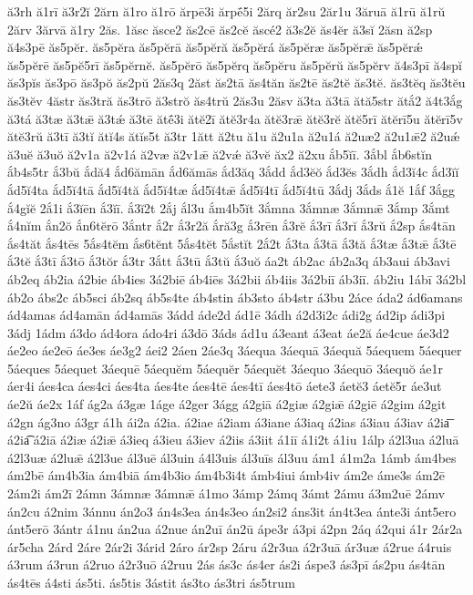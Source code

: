 {ă3rh
ă1rī
ă3r2ĭ
2ărn
ă1ro
ă1rō
ărpē3i
ărpḗ5i
2ărq
ăr2su
2ăr1u
3ăruā
ă1rū
ă1rŭ
2ărv
3ărvā
ă1ry
2ăs.
1ăsc
ăsce2
ăs2cē
ăs2cĕ
ăscé2
ă3s2ĕ
ăs4ĕr
ă3sĭ
2ăsn
ă2sp
ă4s3pē
ăs5pĕr.
ăs5pĕra
ăs5pĕrā
ăs5pĕră
ăs5pĕrá
ăs5pĕræ
ăs5pĕrǣ
ăs5pĕrǽ
ăs5pĕrē
ăs5pĕ5rī
ăs5pĕrnĕ.
ăs5pĕrō
ăs5pĕrq
ăs5pĕru
ăs5pĕrŭ
ăs5pĕrv
ă4s3pī
ă4spĭ
ăs3pĭs
ăs3pō
ăs3pŏ
ăs2pŭ
2ăs3q
2ăst
ăs2tā
ăs4tăn
ăs2tē
ăs2tĕ
ăs3tĕ.
ăs3tĕq
ăs3tĕu
ăs3tĕv
4ăstr
ăs3tră
ăs3trō
ă3strŏ
ăs4trŭ
2ăs3u
2ăsv
ă3ta
ă3tā
ătă5str
ătắ2
ă4t3ắg
ă3tá
ă3tæ
ă3tǣ
ă3tǽ
ă3tē
ătḗ3i
ătĕ2ī
ătĕ3r4a
ătĕ3rǣ
ătĕ3rĕ
ătĕ5rī
ătĕrī5u
ătĕrī5v
ătĕ3rŭ
ă3tī
ă3tĭ
ătĭ4s
ătĭs5t
ă3tr
1ătt
ă2tu
ă1u
ă2u1a
ă2u1á
ă2uæ2
ă2u1ǣ2
ă2uǽ
ă3uĕ
ă3uŏ
ă2v1a
ă2v1á
ă2væ
ă2v1ǣ
ă2vǽ
ă3vĕ
ăx2
ă2xu
ắb5ĭī.
3ắbl
ắb6stĭn
ắb4s5tr
ắ3bŭ
ắdă4
ắd6ămān
ắd6ămās
ắd3ăq
3ắdd
ắd3ĕŏ
ắd3ĕs
3ắdh
ắd3ĭ4c
ắd3ĭĭ
ắd5ĭ4ta
ắd5ĭ4tā
ắd5ĭ4tă
ắd5ĭ4tæ
ắd5ĭ4tǣ
ắd5ĭ4tī
ắd5ĭ4tū
3ắdj
3ắds
ắ1ĕ
1ắf
3ắgg
ắ4gĭĕ
2ắ1i
ắ3ĭēn
ắ3ĭī.
ắ3ĭ2t
2ắj
ắl3u
ắm4b5ĭt
3ắmna
3ắmnæ
3ắmnǣ
3ắmp
3ắmt
ắ4nĭm
ắn2ŏ
ắn6tĕrō
3ắntr
ắ2r
ắ3r2ă
ắră3g
ắ3rēn
ắ3rĕ
ắ3rī
ắ3rĭ
ắ3rŭ
ắ2sp
ắs4tān
ắs4tăt
ắs4tēs
5ắs4tĕm
ắs6tĕnt
5ắs4tĕt
5ắstĭt
2ắ2t
ắ3ta
ắ3tā
ắ3tă
ắ3tæ
ắ3tǣ
ắ3tē
ắ3tĕ
ắ3tī
ắ3tō
ắ3tŏr
ắ3tr
3ắtt
ắ3tū
ắ3tŭ
ắ3uŏ
áa2t
áb2ac
áb2a3q
áb3aui
áb3avi
áb2eq
áb2ia
á2bie
áb4ies
3á2biē
áb4iēs
3á2bii
áb4iis
3á2biī
áb3iī.
áb2iu
1ábī
3á2bl
áb2o
ábs2c
áb5sci
áb2sq
áb5s4te
áb4stin
áb3sto
áb4str
á3bu
2áce
áda2
ád6amans
ád4amas
ád4amān
ád4amās
3ádd
áde2d
ád1ē
3ádh
á2d3i2c
ádi2g
ád2ip
ádi3pi
3ádj
1ádm
á3do
ád4ora
ádo4ri
á3dō
3áds
ád1u
á3eant
á3eat
áe2ă
áe4cue
áe3d2
áe2eo
áe2eō
áe3es
áe3g2
áei2
2áen
2áe3q
3áequa
3áequā
3áequă
5áequem
5áequer
5áeques
5áequet
3áequē
5áequĕm
5áequĕr
5áequĕt
3áequo
3áequō
3áequŏ
áe1r
áer4i
áes4ca
áes4ci
áes4ta
áes4te
áes4tē
áes4tī
áes4tō
áete3
áetĕ3
áetĕ5r
áe3ut
áe2ŭ
áe2x
1áf
ág2a
á3gæ
1áge
á2ger
3ágg
á2giā
á2giæ
á2giǣ
á2giē
á2gim
á2git
á2gn
ág3no
á3gr
á1h
ái2a
á2ia.
á2iae
á2iam
á3iane
á3iaq
á2ias
á3iau
á3iav
á2ia͞
á2ia͡
á2iā
á2iæ
á2iǣ
á3ieq
á3ieu
á3iev
á2iis
á3iit
á1iī
á1i2t
á1iu
1álp
á2l3ua
á2luā
á2l3uæ
á2luǣ
á2l3ue
ál3uē
ál3uin
á4l3uis
ál3uīs
ál3uu
ám1
á1m2a
1ámb
ám4bes
ám2bē
ám4b3ia
ám4biā
ám4b3io
ám4b3i4t
ámb4iui
ámb4iv
ám2e
áme3s
ám2ē
2ám2i
ám2ī
2ámn
3ámnæ
3ámnǣ
á1mo
3ámp
2ámq
3ámt
2ámu
á3m2uē
2ámv
án2cu
á2nim
3ánnu
án2o3
án4s3ea
án4s3eo
án2si2
áns3it
án4t3ea
ánte3i
ánt5ero
ánt5erō
3ántr
á1nu
án2ua
á2nue
án2uī
án2ū
ápe3r
á3pi
á2pn
2áq
á2qui
á1r
2ár2a
ár5cha
2árd
2áre
2ár2i
3árid
2áro
ár2sp
2áru
á2r3ua
á2r3uā
ár3uæ
á2rue
á4ruis
á3rum
á3run
á2ruo
á2r3uō
á2ruu
2ás
ás3c
ás4er
ás2i
áspe3
ás3pī
ás2pu
ás4tān
ás4tēs
á4sti
ás5ti.
ás5tis
3ástit
ás3to
ás3tri
ás5trum
}
